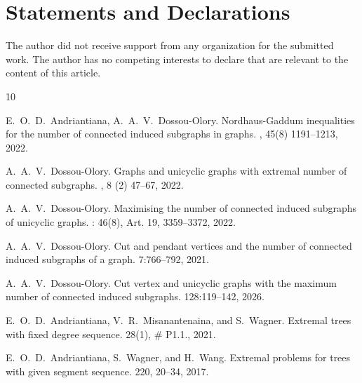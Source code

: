 \documentclass[a4paper,12pt]{amsart}
\theoremstyle{remark}
\begin{document}
\medskip
\section*{Statements and Declarations}

The author did not receive support from any organization for the submitted work. The author has no competing interests to declare that are relevant to the content of this article.

\medskip

\begin{thebibliography}{10}

E.~O.~D.~Andriantiana, A.~A.~V.~Dossou-Olory.
\newblock Nordhaus-Gaddum inequalities for the number of connected induced subgraphs in graphs.
, 45(8) 1191--1213, 2022.
    
A.~A.~V.~Dossou-Olory.
\newblock Graphs and unicyclic graphs with extremal number of connected subgraphs.
, 8 (2) 47--67, 2022.
    
A.~A.~V.~Dossou-Olory.
\newblock Maximising the number of connected induced subgraphs of unicyclic graphs.
: 46(8), Art. 19, 3359--3372, 2022.
	
A.~A.~V.~Dossou-Olory.
\newblock Cut and pendant vertices and the number of connected induced subgraphs of a graph.
 7:766--792, 2021. 


A.~A.~V.~Dossou-Olory.
\newblock Cut vertex and unicyclic graphs with the maximum number of connected induced subgraphs.
 128:119--142, 2026. 
	


E.~O.~D.~Andriantiana, V.~R.~Misanantenaina, and S.~Wagner.
\newblock Extremal trees with fixed degree sequence.
 28(1), \# P1.1., 2021.

E.~O.~D.~Andriantiana, S.~Wagner, and H.~Wang.
\newblock Extremal problems for trees with given segment sequence.
 220, 20--34, 2017.


\end{thebibliography}
\end{document}
